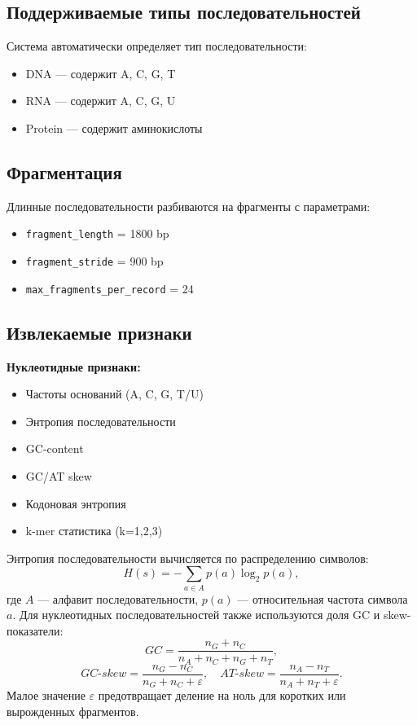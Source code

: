 \subsection{Поддерживаемые типы последовательностей}

Система автоматически определяет тип последовательности:
\begin{itemize}
\item DNA — содержит A, C, G, T
\item RNA — содержит A, C, G, U
\item Protein — содержит аминокислоты
\end{itemize}

\subsection{Фрагментация}

Длинные последовательности разбиваются на фрагменты с параметрами:
\begin{itemize}
\item \texttt{fragment\_length} = 1800 bp
\item \texttt{fragment\_stride} = 900 bp
\item \texttt{max\_fragments\_per\_record} = 24
\end{itemize}

\subsection{Извлекаемые признаки}

\textbf{Нуклеотидные признаки:}
\begin{itemize}
\item Частоты оснований (A, C, G, T/U)
\item Энтропия последовательности
\item GC-content
\item GC/AT skew
\item Кодоновая энтропия
\item k-mer статистика (k=1,2,3)
\end{itemize}

Энтропия последовательности вычисляется по распределению символов:
\begin{equation}
H(s) = - \sum_{a \in A} p(a)\log_2 p(a),
\end{equation}
где \(A\) — алфавит последовательности, \(p(a)\) — относительная частота символа \(a\). Для нуклеотидных последовательностей также используются доля GC и skew-показатели:
\begin{equation}
GC = \frac{n_G + n_C}{n_A + n_C + n_G + n_T},
\end{equation}
\begin{equation}
GC\text{-}skew = \frac{n_G - n_C}{n_G + n_C + \varepsilon}, \quad
AT\text{-}skew = \frac{n_A - n_T}{n_A + n_T + \varepsilon}.
\end{equation}
Малое значение \(\varepsilon\) предотвращает деление на ноль для коротких или вырожденных фрагментов.

